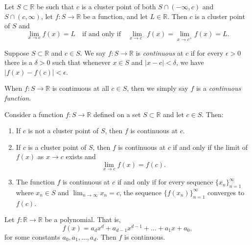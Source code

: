 \documentclass[../main.tex]{subfiles}
\begin{document}
    \begin{proposition}
        Let $S \subset \mathbb{R}$ be such that $c$ is a cluster point of both $S \cap (-\infty, c)$ and $S \cap (c, \infty)$, let $f : S \to \mathbb{R}$ be a function, and let $L \in \mathbb{R}$. Then $c$ is a cluster point of $S$ and
        \[
        \lim_{x\to c} f(x) = L \quad \text{if and only if} \quad \lim_{x\to c^-} f(x) = \lim_{x\to c^+} f(x) = L.
        \]
    \end{proposition}
        
    \begin{definition}
        Suppose $S \subset \mathbb{R}$ and $c \in S$. We say $f : S \to \mathbb{R}$ is \textit{continuous} at $c$ if for every $\epsilon > 0$ there is a $\delta > 0$ such that whenever $x \in S$ and $|x - c| < \delta$, we have $|f(x) - f(c)| < \epsilon$.
        
        When $f : S \to \mathbb{R}$ is continuous at all $c \in S$, then we simply say $f$ is a \textit{continuous function}.
    \end{definition}
        
    
    \begin{proposition}
        Consider a function $f : S \to \mathbb{R}$ defined on a set $S \subset \mathbb{R}$ and let $c \in S$. Then:
    \begin{enumerate}
        \item If $c$ is not a cluster point of $S$, then $f$ is continuous at $c$.
        \item If $c$ is a cluster point of $S$, then $f$ is continuous at $c$ if and only if the limit of $f(x)$ as $x \to c$ exists and
            \[
            \lim_{x\to c} f(x) = f(c).
            \]
        \item The function $f$ is continuous at $c$ if and only if for every sequence $\{x_n\}_{n=1}^{\infty}$ where $x_n \in S$ and $\lim_{n\to\infty} x_n = c$, the sequence $\{f(x_n)\}_{n=1}^{\infty}$ converges to $f(c)$.
    \end{enumerate}
    \end{proposition}
        
    \begin{proposition}
        Let $f : \mathbb{R} \to \mathbb{R}$ be a polynomial. That is,
        \[
        f(x) = a_d x^d + a_{d-1} x^{d-1} + \dots + a_1 x + a_0,
        \]
        for some constants $a_0, a_1, \dots, a_d$. Then $f$ is continuous.
    \end{proposition}
        
\end{document}

